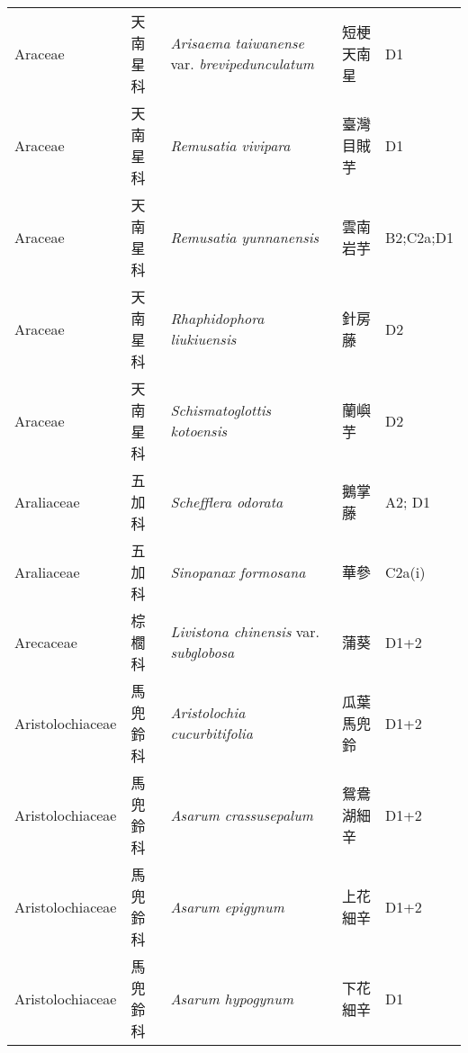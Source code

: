 {\begin{longtable}{p{2.5cm}p{2.5cm}p{4.5cm}p{2.5cm}p{3cm}}
    Araceae & 天南星科 & \textit{Arisaema taiwanense} var. \textit{brevipedunculatum}  & 短梗天南星 & D1 \index{Arisaema@\textit{Arisaema}!taiwanense@\textit{taiwanense}!var. brevipedunculatum@var. \textit{brevipedunculatum}}  \index{短梗天南星} \\
    Araceae & 天南星科 & \textit{Remusatia vivipara}  & 臺灣目賊芋 & D1 \index{Remusatia@\textit{Remusatia}!vivipara@\textit{vivipara}}  \index{臺灣目賊芋} \\
    Araceae & 天南星科 & \textit{Remusatia yunnanensis}  & 雲南岩芋 & B2;C2a;D1 \index{Remusatia@\textit{Remusatia}!yunnanensis@\textit{yunnanensis}}  \index{雲南岩芋} \\
    Araceae & 天南星科 & \textit{Rhaphidophora liukiuensis}  & 針房藤 & D2 \index{Rhaphidophora@\textit{Rhaphidophora}!liukiuensis@\textit{liukiuensis}}  \index{針房藤} \\
    Araceae & 天南星科 & \textit{Schismatoglottis kotoensis}  & 蘭嶼芋 & D2 \index{Schismatoglottis@\textit{Schismatoglottis}!kotoensis@\textit{kotoensis}}  \index{蘭嶼芋} \\
    Araliaceae & 五加科 & \textit{Schefflera odorata}  & 鵝掌藤 & A2; D1 \index{Schefflera@\textit{Schefflera}!odorata@\textit{odorata}}  \index{鵝掌藤} \\
    Araliaceae & 五加科 & \textit{Sinopanax formosana}  & 華參 & C2a(i) \index{Sinopanax@\textit{Sinopanax}!formosana@\textit{formosana}}  \index{華參} \\
    Arecaceae & 棕櫚科 & \textit{Livistona chinensis} var. \textit{subglobosa}  & 蒲葵 & D1+2 \index{Livistona@\textit{Livistona}!chinensis@\textit{chinensis}!var. subglobosa@var. \textit{subglobosa}}  \index{蒲葵} \\
    Aristolochiaceae & 馬兜鈴科 & \textit{Aristolochia cucurbitifolia}  & 瓜葉馬兜鈴 & D1+2 \index{Aristolochia@\textit{Aristolochia}!cucurbitifolia@\textit{cucurbitifolia}}  \index{瓜葉馬兜鈴} \\
    Aristolochiaceae & 馬兜鈴科 & \textit{Asarum crassusepalum}  & 鴛鴦湖細辛 & D1+2 \index{Asarum@\textit{Asarum}!crassusepalum@\textit{crassusepalum}}  \index{鴛鴦湖細辛} \\
    Aristolochiaceae & 馬兜鈴科 & \textit{Asarum epigynum}  & 上花細辛 & D1+2 \index{Asarum@\textit{Asarum}!epigynum@\textit{epigynum}}  \index{上花細辛} \\
    Aristolochiaceae & 馬兜鈴科 & \textit{Asarum hypogynum}  & 下花細辛 & D1 \index{Asarum@\textit{Asarum}!hypogynum@\textit{hypogynum}}  \index{下花細辛} \\

\end{longtable}}
